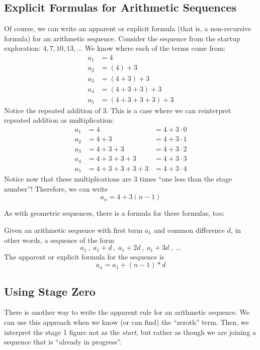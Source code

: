 \subsection{Explicit Formulas for Arithmetic Sequences}

Of course, we can write an apparent or explicit formula (that is, a non-recursive formula) for an arithmetic sequence. Consider the sequence from the startup exploration: $4, 7, 10, 13,\dotsc$ We know where each of the terms come from:
\[\begin{aligned}
a_1 &= 4
\\
a_2 &= (4) + 3
\\
a_3 &= (4 + 3) + 3
\\
a_4 &= (4 + 3 + 3) + 3
\\
a_5 &= (4 + 3 + 3 + 3) + 3
\end{aligned}\]
Notice the repeated addition of 3. This is a case where we can reinterpret repeated addition as multiplication:
\[\begin{aligned}
a_1 &= 4 				&= 4 + 3\cdot0 
\\
a_2 &= 4 +3			&= 4 + 3\cdot1
\\
a_3 &= 4 +3 +3			&= 4 + 3\cdot2
\\
a_4 &= 4 +3 +3 +3		&= 4 + 3\cdot3
\\
a_5 &= 4 +3 +3 +3 +3	&= 4 + 3\cdot4
\end{aligned}\]
Notice now that these multiplications are 3 times ``one less than the stage number''! Therefore, we can write \[a_n = 4 + 3 (n-1)\]

As with geometric sequences, there is a formula for these formulas, too:

\begin{boxeddef}
Given an arithmetic sequence with first term $a_1$ and common difference $d$, in other words, a sequence of the form \[a_1~,~ a_1 + d~,~ a_1 + 2d~,~ a_1 + 3d~,~ \dotsc\] The apparent or explicit formula for the sequence is \[a_n = a_1 + (n-1) \ast d\]
\end{boxeddef}

\subsection{Using Stage Zero}

There is another way to write the apparent rule for an arithmetic sequence. We can use this approach when we know (or can find) the ``zeroth'' term. Then, we interpret the stage 1 figure not as the \textit{start}, but rather as though we are joining a sequence that is ``already in progress''.


